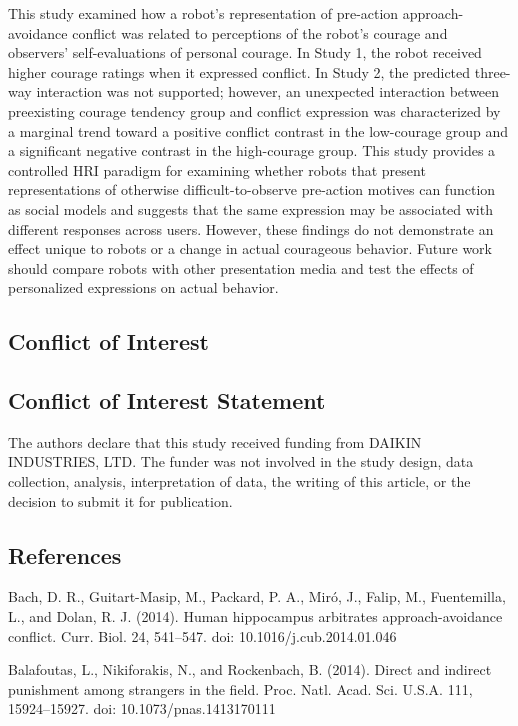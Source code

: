 This study examined how a robot's representation of pre-action
approach-avoidance conflict was related to perceptions of the robot's
courage and observers' self-evaluations of personal courage. In Study 1,
the robot received higher courage ratings when it expressed conflict. In
Study 2, the predicted three-way interaction was not supported; however,
an unexpected interaction between preexisting courage tendency group and
conflict expression was characterized by a marginal trend toward a
positive conflict contrast in the low-courage group and a significant
negative contrast in the high-courage group. This study provides a
controlled HRI paradigm for examining whether robots that present
representations of otherwise difficult-to-observe pre-action motives can
function as social models and suggests that the same expression may be
associated with different responses across users. However, these
findings do not demonstrate an effect unique to robots or a change in
actual courageous behavior. Future work should compare robots with other
presentation media and test the effects of personalized expressions on
actual behavior.

\subsection{Conflict of Interest}\label{conflict-of-interest}

\subsection{Conflict of Interest
Statement}\label{conflict-of-interest-statement}

The authors declare that this study received funding from DAIKIN
INDUSTRIES, LTD. The funder was not involved in the study design, data
collection, analysis, interpretation of data, the writing of this
article, or the decision to submit it for publication.

\subsection{References}\label{references}

Bach, D. R., Guitart-Masip, M., Packard, P. A., Miró, J., Falip, M.,
Fuentemilla, L., and Dolan, R. J. (2014). Human hippocampus arbitrates
approach-avoidance conflict. Curr. Biol. 24, 541--547. doi:
10.1016/j.cub.2014.01.046

Balafoutas, L., Nikiforakis, N., and Rockenbach, B. (2014). Direct and
indirect punishment among strangers in the field. Proc. Natl. Acad. Sci.
U.S.A. 111, 15924--15927. doi: 10.1073/pnas.1413170111

